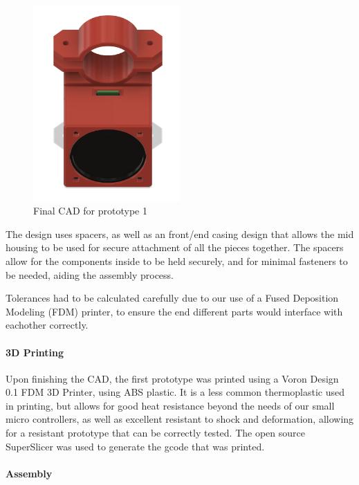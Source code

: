 {\begin{figure}[ht!]
            \includegraphics[width=0.5\textwidth,keepaspectratio, angle=0]{./figures/final-cad.png}
            \caption{Final CAD for prototype 1}
        \label{fig:interior}
    \end{figure}

The design uses spacers, as well as an front/end casing design that allows the mid housing to be used for secure attachment of all the pieces together. The spacers allow for the components inside to be held securely, and for minimal fasteners to be needed, aiding the assembly process.



Tolerances had to be calculated carefully due to our use of a Fused Deposition Modeling (FDM) printer, to ensure the end different parts would interface with eachother correctly.

\paragraph{3D Printing}

Upon finishing the CAD, the first prototype was printed using a Voron Design 0.1 FDM 3D Printer, using ABS plastic. It is a less common thermoplastic used in printing, but allows for good heat resistance beyond the needs of our small micro controllers, as well as excellent resistant to shock and deformation, allowing for a resistant prototype that can be correctly tested. The open source SuperSlicer was used to generate the gcode that was printed.

\paragraph{Assembly}

}
